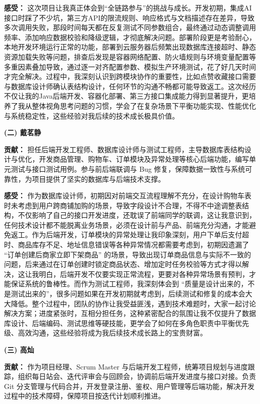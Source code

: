 \textbf{感受：} 这次项目让我真正体会到“全链路参与”的挑战与成长。开发初期，集成AI接口时踩了不少坑，第三方API的限流规则、响应格式与文档描述存在差异，导致多次调用失败，那段时间每天都在反复测试不同参数组合，最终通过动态调整调用频率、添加响应数据校验和降级逻辑，才彻底解决问题。部署阶段更是考验耐心，本地开发环境运行正常的功能，部署到云服务器后频繁出现数据库连接超时、静态资源加载失败等问题，排查后发现是容器网络配置、防火墙规则与环境变量配置等多重因素叠加导致，通过逐一对齐配置参数、模拟生产环境测试，花了好几天时间才完全解决。过程中，我深刻认识到跨模块协作的重要性，比如点赞收藏接口需要与数据库设计师确认表结构设计，任何环节的沟通不畅都可能导致返工。这次经历不仅让我的Java后端开发、容器化部署、第三方接口集成能力得到显著提升，更培养了我从整体视角思考问题的习惯，学会了在复杂场景下平衡功能实现、性能优化与系统稳定性，这些经验对我后续的技术成长极具价值。

\textbf{}

\noindent \textbf{(二) 戴茗静}

\textbf{贡献：} 担任后端开发工程师、数据库设计师与测试工程师，主导数据库表结构设计与优化，开发商品管理、购物车、订单模块及异常处理等核心后端功能，编写单元测试与接口测试用例。参与前后端联调与 Bug 修复，保障数据一致性与系统可靠性，为项目提供了坚实的数据库与后端技术支撑。

\textbf{感受：} 作为数据库设计师，初期因对前端交互流程理解不充分，在设计购物车表时未考虑到用户跨商铺加购的场景，导致字段设计不合理，不得不中途调整表结构，不仅影响了自己的接口开发进度，还耽误了前端同学的联调，这让我意识到，任何技术设计都不能脱离业务场景，必须在设计前与产品、前端充分沟通，才能避免返工。作为后端开发，订单模块的异常处理让我印象深刻，用户下单后支付超时、商品库存不足、地址信息错误等各种异常情况都需要考虑到，初期因遗漏了 “订单创建后商家立即下架商品” 的场景，导致出现订单商品信息与实际不一致的问题，后来通过在订单创建时锁定商品状态、增加定时任务校验等方式才得以解决，这让我明白，后端开发不仅要实现正常流程，更要对各种异常场景有预判，才能保证系统的鲁棒性。而作为测试工程师，我深刻体会到 “质量是设计出来的，不是测试出来的”，很多问题如果在开发初期就考虑到，后续测试和修复的成本会大大降低。整个过程中，团队的协作让我受益匪浅，遇到技术难题时，大家一起讨论解决方案；进度紧张时，互相分担任务，这种紧密配合的氛围让我不仅提升了数据库设计、后端编码、测试思维等硬技能，更学会了如何在多角色职责中平衡优先级、高效沟通，这些经验将成为我后续技术成长路上的宝贵财富。

\textbf{}

\noindent \textbf{(三) 高灿}

\textbf{贡献：} 作为项目经理、Scrum Master 与后端开发工程师，统筹项目规划与进度跟踪，组织每日站会、迭代评审会与回顾会，协调前后端开发进度与接口对接。负责 Git 分支管理与代码合并，开发登录注册、鉴权、用户管理等后端功能，解决开发过程中的技术障碍，保障项目按迭代计划顺利推进。

